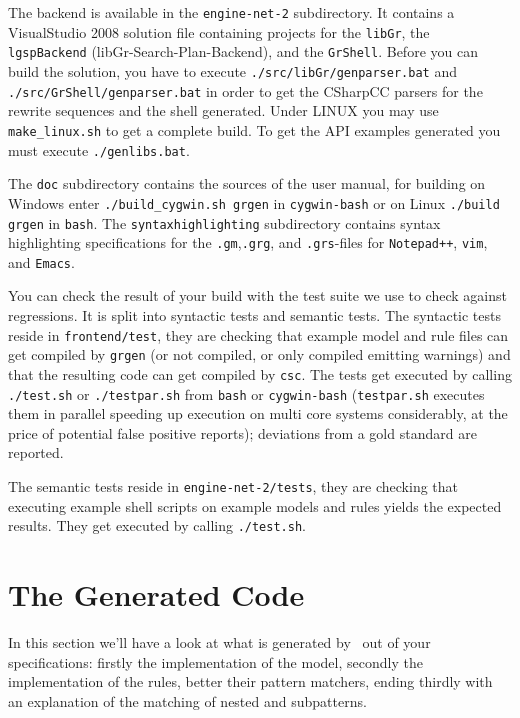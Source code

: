 The backend is available in the \texttt{engine-net-2} subdirectory. 
It contains a VisualStudio 2008 solution file containing projects for the \texttt{libGr}, the \texttt{lgspBackend} (libGr-Search-Plan-Backend), and the \texttt{GrShell}.
Before you can build the solution, you have to execute \texttt{./src/libGr/genparser.bat} and \texttt{./src/Gr\-Shell/genparser.bat} in order 
to get the CSharpCC parsers for the rewrite sequences and the shell generated.
Under LINUX you may use \texttt{make\_linux.sh} to get a complete build.
To get the API examples generated you must execute \texttt{./genlibs.bat}.

The \texttt{doc} subdirectory contains the sources of the user manual, for building on Windows enter \texttt{./build\_cygwin.sh grgen} in \texttt{cygwin-bash} or on Linux \texttt{./build grgen} in \texttt{bash}.
The \texttt{syntaxhighlighting} subdirectory contains syntax highlighting specifications for the \texttt{.gm},\texttt{.grg}, and \texttt{.grs}-files for \texttt{Notepad++}, \texttt{vim}, and \texttt{Emacs}.

You can check the result of your build with the test suite we use to check against regressions.
It is split into syntactic tests and semantic tests. 
The syntactic tests reside in \texttt{frontend/test}, they are checking that example model and rule files can get compiled by \texttt{grgen} (or not compiled, or only compiled emitting warnings) and that the resulting code can get compiled by \texttt{csc}.
The tests get executed by calling \texttt{./test.sh} or \texttt{./testpar.sh} from \texttt{bash} or \texttt{cygwin-bash} (\texttt{testpar.sh} executes them in parallel speeding up execution on multi core systems considerably, at the price of potential false positive reports); deviations from a gold standard are reported.

The semantic tests reside in \texttt{engine-net-2/tests}, they are checking that executing example shell scripts on example models and rules yields the expected results. 
They get executed by calling \texttt{./test.sh}.


\section{The Generated Code}\label{sec:generatedcode}
In this section we'll have a look at what is generated by \GrG~out of your specifications: firstly the implementation of the model, secondly the implementation of the rules, better their pattern matchers, ending thirdly with an explanation of the matching of nested and subpatterns.

